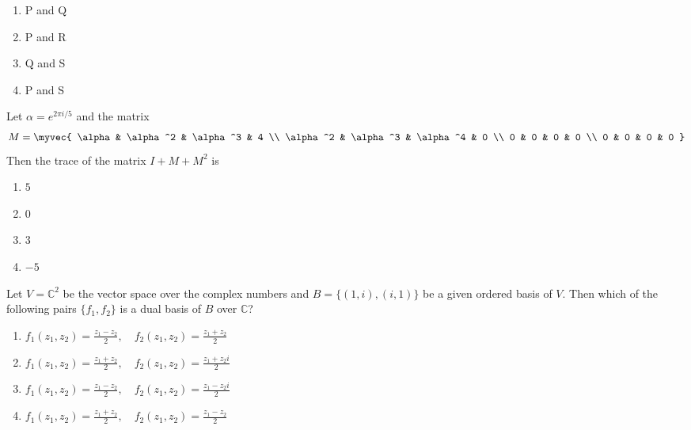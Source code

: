\hfill{}
\begin{multicols}{2}
\begin{enumerate}
  \item P and Q
  \item P and R
  \item Q and S
  \item P and S
\end{enumerate}


\item
Let $\alpha = e^{2 \pi i/5}$ and the matrix
\begin{align}
M = \myvec{
\alpha & \alpha^2 & \alpha^3 & 4 \\
\alpha^2 & \alpha^3 & \alpha^4 & 0 \\
0 & 0 & 0 & 0 \\
0 & 0 & 0 & 0
}
\end{align}
Then the trace of the matrix $I + M + M^2$ is
\hfill{}
\begin{multicols}{4}
\begin{enumerate}
  \item $5$
  \item $0$
  \item $3$
  \item $-5$
\end{enumerate}
\end{multicols}

\item
Let $V = \mathbb{C}^2$ be the vector space over the complex numbers and $B = \{(1, i), (i, 1)\}$ be a given ordered basis of $V$. Then which of the following pairs $\{f_1, f_2\}$ is a dual basis of $B$ over $\mathbb{C}$?
\hfill{}

\begin{enumerate}
  \item $f_1(z_1, z_2) = \frac{z_1 - z_2}{2}, \quad f_2(z_1, z_2) = \frac{z_1 + z_2}{2}$
  \item $f_1(z_1, z_2) = \frac{z_1 + z_2}{2}, \quad f_2(z_1, z_2) = \frac{z_1 + z_2 i}{2}$
  \item $f_1(z_1, z_2) = \frac{z_1 - z_2}{2}, \quad f_2(z_1, z_2) = \frac{z_1 - z_2 i}{2}$
  \item $f_1(z_1, z_2) = \frac{z_1 + z_2}{2}, \quad f_2(z_1, z_2) = \frac{z_1 - z_2}{2}$
\end{enumerate}



\end{multicols}
